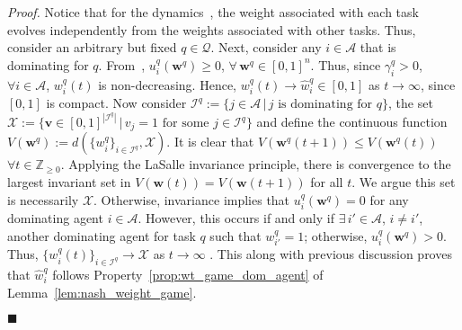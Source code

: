 \documentclass{IEEEtran}
\newcommand{\ldef}{:=}
\newcommand{\Mcal}[1]{\mathcal{#1}}
\newcommand{\Mc}[1]{\mathcal{#1}}
\newcommand{\bld}[1]{\mathbf{#1}}
\newcommand{\integer}{\ensuremath{\mathbb{Z}}}
\newcommand{\squaresym}{\hbox{$\blacksquare$}}
\newcommand{\proofend}{\relax\ifmmode\else\unskip\hfill\fi\squaresym}
\renewenvironment{proof}{\textit{Proof.} }{\proofend}
\renewcommand{\hat}[1]{\widehat{#1}}
\newcommand{\marginn}[1]{\marginpar{\color{blue}\tiny\ttfamily#1}}
\newcommand{\margin}[1]{\marginpar{\color{magenta}\tiny\ttfamily#1}}
\def \agt{\Mcal{A}}
\def \I{\Mcal{I}}
\def \integer{\mathbb{Z}}
\def \intpos{\integer_{\geq 0}}
\def \tsk{\Mc{Q}}
\def \v{\bld{v}}
\def \w{\bld{w}}
\def \what{\hat{w}}
\def \X{\Mcal{X}}
\begin{document}
\begin{proof}
  Notice that for the dynamics~, the
  weight associated with each task evolves independently from the
  weights associated with other tasks. Thus, consider an arbitrary but
  fixed $q \in \tsk$. Next, consider any $i \in \agt$ that is dominating for
  $q$. From~, $u^q_i(\w^q) \geq 0$,
  $\forall \, \w^q \in [0,1]^n$. Thus, since $\gamma^q_i > 0$,
  $\forall i \in \agt$, $w^q_i(t)$ is
  non-decreasing.
  Hence, $w^q_i(t) \to \what^q_i \in [0,1]$ as
  $t \to \infty$, since $[0,1]$ is compact. Now consider $\I^q \ldef \{j \in \agt\,|\, j \,\, \mathrm{is \,\, dominating \,\, for}\,\, q\}$, the set $\X \ldef \{\v \in [0,1]^{|\I^q|} \,|\, v_j = 1\,\, \mathrm{for\,\, some}\,\, j \in \I^q \}$ and define the continuous function $V(\w^q) \ldef d(\{w^q_i\}_{i \in \I^q}, \X)$. 
It is clear that %
$V(\w^q(t+1)) \leq V(\w^q(t))$ $\forall t \in \intpos$. Applying the LaSalle invariance principle, there is convergence to the largest invariant set in $V(\w(t)) = V(\w(t+1))$ for all $t$. We argue this set is necessarily $\X$. Otherwise, invariance implies that $u^q_i(\w^q) = 0$ for any dominating agent $i \in \agt$. However, this occurs if and only if
%
%
  $\exists \,i' \in \agt$, $i\neq i'$, another dominating agent for
  task $q$ such that $w^q_{i'} = 1$; 
  otherwise, $u^q_i(\w^q) > 0$. %
  Thus, $\{w^q_i(t)\}_{i \in \I^q} \to \X$ as $t \to \infty$ . This along with previous discussion proves that $\what^q_i$ follows Property~\ref{prop:wt_game_dom_agent}
%
%
  of Lemma~\ref{lem:nash_weight_game}.  


\end{proof}
\end{document}
